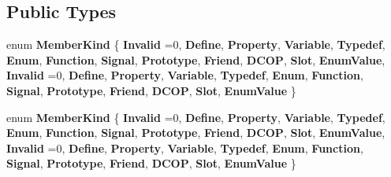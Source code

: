 \subsection*{Public Types}
\begin{DoxyCompactItemize}
\item 
\mbox{\label{class_i_member_ab486b4d2fdebc7a181e8dd0a09170956}} 
enum {\bfseries Member\+Kind} \{ \newline
{\bfseries Invalid} =0, 
{\bfseries Define}, 
{\bfseries Property}, 
{\bfseries Variable}, 
\newline
{\bfseries Typedef}, 
{\bfseries Enum}, 
{\bfseries Function}, 
{\bfseries Signal}, 
\newline
{\bfseries Prototype}, 
{\bfseries Friend}, 
{\bfseries D\+C\+OP}, 
{\bfseries Slot}, 
\newline
{\bfseries Enum\+Value}, 
{\bfseries Invalid} =0, 
{\bfseries Define}, 
{\bfseries Property}, 
\newline
{\bfseries Variable}, 
{\bfseries Typedef}, 
{\bfseries Enum}, 
{\bfseries Function}, 
\newline
{\bfseries Signal}, 
{\bfseries Prototype}, 
{\bfseries Friend}, 
{\bfseries D\+C\+OP}, 
\newline
{\bfseries Slot}, 
{\bfseries Enum\+Value}
 \}
\item 
\mbox{\label{class_i_member_ab486b4d2fdebc7a181e8dd0a09170956}} 
enum {\bfseries Member\+Kind} \{ \newline
{\bfseries Invalid} =0, 
{\bfseries Define}, 
{\bfseries Property}, 
{\bfseries Variable}, 
\newline
{\bfseries Typedef}, 
{\bfseries Enum}, 
{\bfseries Function}, 
{\bfseries Signal}, 
\newline
{\bfseries Prototype}, 
{\bfseries Friend}, 
{\bfseries D\+C\+OP}, 
{\bfseries Slot}, 
\newline
{\bfseries Enum\+Value}, 
{\bfseries Invalid} =0, 
{\bfseries Define}, 
{\bfseries Property}, 
\newline
{\bfseries Variable}, 
{\bfseries Typedef}, 
{\bfseries Enum}, 
{\bfseries Function}, 
\newline
{\bfseries Signal}, 
{\bfseries Prototype}, 
{\bfseries Friend}, 
{\bfseries D\+C\+OP}, 
\newline
{\bfseries Slot}, 
{\bfseries Enum\+Value}
 \}
\end{DoxyCompactItemize}
